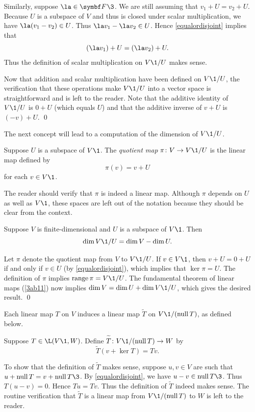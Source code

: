 Similarly, suppose $\la \in \F{}\3$. We are still assuming that $v_1 + U = v_2 + U$. Because $U$ is a subspace of $V$ and thus is closed under scalar multiplication, we have $\la(v_1 - v_2) \in U$. Thus $\la v_1 - \la v_2 \in U$. Hence \ref{equalordisjoint} implies that
\[
(\la v_1) + U = (\la v_2) + U.
\]
Thus the definition of scalar multiplication on $V\1/U$ makes sense.

Now that addition and scalar multiplication have been defined on $V\1/U$, the verification that these operations make $V\1/U$ into a vector space is straightforward and is left to the reader. Note that the additive identity of $V\1/U$ is $0 + U$ (which equals $U$) and that the additive inverse of $v + U$ is $(-v) + U$. \qed

The next concept will lead to a computation of the dimension of $V\1/U$.

{Suppose $U$ is a subspace of $V\1$. The \emph{quotient map} $\pi \colon V \to V\1/U$ is the linear map defined by
\[
\pi(v) = v + U
\]
for each $v \in V\1$.}

The reader should verify that $\pi$ is indeed a linear map. Although $\pi$ depends on $U$ as well as $V\1$, these spaces are left out of the notation because they should be clear from the context.

{Suppose $V$ is finite-dimensional and $U$ is a subspace of $V\1$. Then
\vspace{-.04in}
\[
\dim V\1/U = \dim V - \dim U.
\]}

\proof
Let $\pi$ denote the quotient map from $V$ to $V\1/U$. If $v \in V\1$, then $v + U = 0 + U$ if and only if $v \in U$ (by \ref{equalordisjoint}), which implies that $\ker \pi = U$. The definition of $\pi$ implies $\ran \pi = V\1/U$. The fundamental theorem of linear maps (\ref{3ab11}) now implies
$
\dim V = \dim U + \dim V\1/U$,
which gives the desired result.
\qed

Each linear map $T$ on $V$ induces a linear map $\tilde{T}$ on $V\1/(\ker T)$, as defined below.

{Suppose $T \in \L(V\1, W)$. Define $\tilde{T} \colon V\1/(\ker T) \to W$ by
\vspace{-.05in}
\[
\tilde{T}(v + \ker T) = Tv.
\]}

To show that the definition of $\tilde{T}$ makes sense, suppose $u, v \in V$ are such that $u + \ker T = v + \ker T\3$. By \ref{equalordisjoint}, we have $u - v \in \ker T\3$. Thus $T(u - v) = 0$. Hence $Tu = Tv$. Thus the definition of $\tilde{T}$ indeed makes sense. The routine verification that $\tilde{T}$ is a linear map from $V\1/(\ker T)$ to $W$ is left to the reader.

